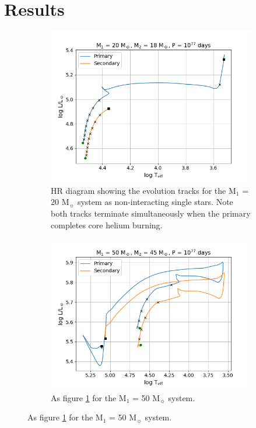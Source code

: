 \section{Results} %

\begin{figure}
    \centering
    \begin{subfigure}{\columnwidth}
        \includegraphics[width=\textwidth]{figures/results1/fig_HR_M20_Sin.png}
        \captionsetup{width=.9\columnwidth}
        \caption{HR diagram showing the evolution tracks for the M$_1$ = 20 M$_{\sun}$ system as non-interacting single stars.
        Note both tracks terminate simultaneously when the primary completes core helium burning.}
        \label{subfig:20Msol_HR_Sin}
    \end{subfigure}
    \hfill
    \begin{subfigure}{\columnwidth}
        \includegraphics[width=\textwidth]{figures/results1/fig_HR_M50_Sin.png}
        \captionsetup{width=.9\columnwidth}
        \caption{As figure \ref{subfig:20Msol_HR_Sin} for the M$_1$ = 50 M$_{\sun}$ system. \newline \newline}
        \label{subfig:50Msol_HR_Sin}
    \end{subfigure}
    

\end{figure}

